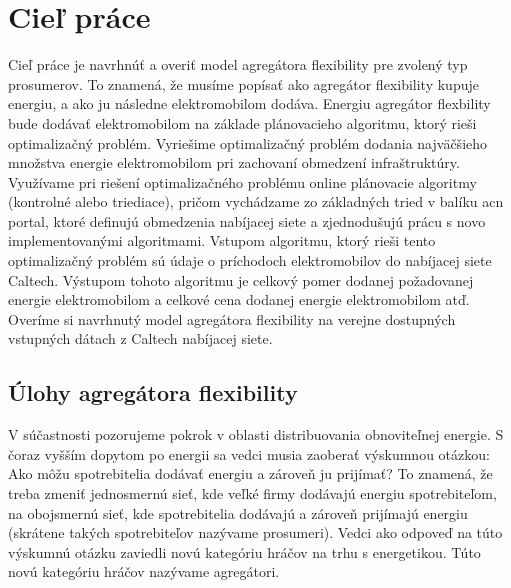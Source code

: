 

\chapter{Cieľ práce}

Cieľ práce je navrhnúť a overiť model agregátora flexibility pre zvolený typ prosumerov. To znamená, že musíme popísať ako agregátor flexibility kupuje energiu, a ako ju následne elektromobilom dodáva. Energiu agregátor flexbility bude dodávať elektromobilom na základe plánovacieho algoritmu, ktorý rieši optimalizačný problém.  Vyriešime optimalizačný problém dodania najväčšieho množstva energie elektromobilom pri zachovaní obmedzení infraštruktúry. Využívame pri riešení optimalizačného problému online plánovacie algoritmy (kontrolné alebo triediace), pričom vychádzame zo základných tried v balíku acn portal, ktoré definujú obmedzenia nabíjacej siete a zjednodušujú prácu s novo implementovanými algoritmami. Vstupom algoritmu, ktorý rieši tento optimalizačný problém sú údaje o príchodoch elektromobilov do nabíjacej siete Caltech. Výstupom tohoto algoritmu je celkový pomer dodanej požadovanej energie elektromobilom a celkové cena dodanej energie elektromobilom atď. Overíme si navrhnutý model agregátora flexibility na verejne dostupných vstupných dátach z Caltech nabíjacej siete.  










\section{Úlohy agregátora flexibility}
V súčastnosti pozorujeme pokrok v oblasti distribuovania obnoviteľnej energie. S čoraz vyšším dopytom po energii sa vedci musia zaoberať výskumnou otázkou: Ako môžu spotrebitelia dodávať energiu a zároveň ju prijímať? To znamená, že treba zmeniť jednosmernú sieť, kde veľké firmy dodávajú energiu spotrebiteľom, na obojsmernú sieť, kde spotrebitelia dodávajú a zároveň prijímajú energiu (skrátene takých spotrebiteľov nazývame prosumeri). Vedci ako odpoveď na túto výskumnú otázku zaviedli novú kategóriu hráčov na trhu s energetikou. Túto novú kategóriu hráčov nazývame agregátori. 


